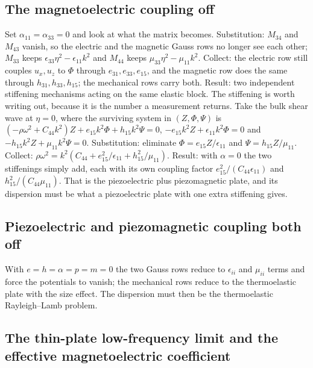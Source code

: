 \documentclass[11pt]{article}
\makeatletter
\newif\ifshowworked
\newenvironment{worked}{%
  \ifshowworked\par\smallskip\noindent\textit{Working.}\par\smallskip\else
  \setbox\z@\vbox\bgroup\fi}{\ifshowworked\par\smallskip\else\egroup\fi}
\makeatother
\begin{document}
\subsection*{The magnetoelectric coupling off}

\begin{worked}
Set $\alpha_{11}=\alpha_{33}=0$ and look at what the matrix becomes. Substitution: $M_{34}$ and $M_{43}$
vanish, so the electric and the magnetic Gauss rows no longer see each other; $M_{33}$ keeps
$\epsilon_{33}\eta^2-\epsilon_{11}k^2$ and $M_{44}$ keeps $\mu_{33}\eta^2-\mu_{11}k^2$. Collect: the
electric row still couples $u_x,u_z$ to $\Phi$ through $e_{31},e_{33},e_{15}$, and the magnetic row does
the same through $h_{31},h_{33},h_{15}$; the mechanical rows carry both. Result: two independent
stiffening mechanisms acting on the same elastic block.
The stiffening is worth writing out, because it is the number a measurement returns. Take the bulk shear
wave at $\eta=0$, where the surviving system in $(Z,\Phi,\Psi)$ is
$(-\rho\omega^2+C_{44}k^2)Z+e_{15}k^2\Phi+h_{15}k^2\Psi=0$,
$-e_{15}k^2Z+\epsilon_{11}k^2\Phi=0$ and $-h_{15}k^2Z+\mu_{11}k^2\Psi=0$.
Substitution: eliminate $\Phi=e_{15}Z/\epsilon_{11}$ and $\Psi=h_{15}Z/\mu_{11}$. Collect:
$\rho\omega^2=k^2(C_{44}+e_{15}^2/\epsilon_{11}+h_{15}^2/\mu_{11})$. Result: with $\alpha=0$ the two
stiffenings simply add, each with its own coupling factor $e_{15}^2/(C_{44}\epsilon_{11})$ and
$h_{15}^2/(C_{44}\mu_{11})$. That is the piezoelectric plus piezomagnetic plate, and its dispersion must
be what a piezoelectric plate with one extra stiffening gives.
\end{worked}

\subsection*{Piezoelectric and piezomagnetic coupling both off}

\begin{worked}
With $e=h=\alpha=p=m=0$ the two Gauss rows reduce to $\epsilon_{ii}$ and $\mu_{ii}$ terms and force the
potentials to vanish; the mechanical rows reduce to the thermoelastic plate with the size effect. The
dispersion must then be the thermoelastic Rayleigh--Lamb problem.
\end{worked}

\subsection*{The thin-plate low-frequency limit and the effective magnetoelectric coefficient}
\end{document}
